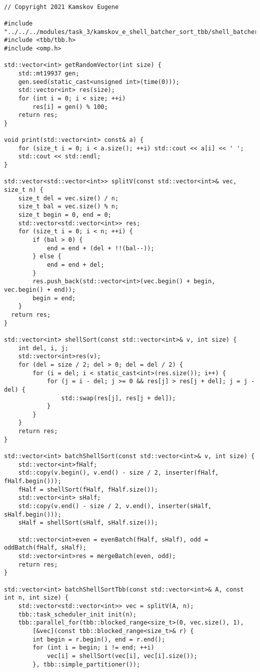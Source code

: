 \documentclass{report}
\begin{document}
\begin{lstlisting}

// Copyright 2021 Kamskov Eugene

#include "../../../modules/task_3/kamskov_e_shell_batcher_sort_tbb/shell_batcher.h"
#include <tbb/tbb.h>
#include <omp.h>

std::vector<int> getRandomVector(int size) {
    std::mt19937 gen;
    gen.seed(static_cast<unsigned int>(time(0)));
    std::vector<int> res(size);
    for (int i = 0; i < size; ++i)
        res[i] = gen() % 100;
    return res;
}

void print(std::vector<int> const& a) {
    for (size_t i = 0; i < a.size(); ++i) std::cout << a[i] << ' ';
    std::cout << std::endl;
}

std::vector<std::vector<int>> splitV(const std::vector<int>& vec, size_t n) {
    size_t del = vec.size() / n;
    size_t bal = vec.size() % n;
    size_t begin = 0, end = 0;
    std::vector<std::vector<int>> res;
    for (size_t i = 0; i < n; ++i) {
        if (bal > 0) {
            end = end + (del + !!(bal--));
        } else {
            end = end + del;
        }
        res.push_back(std::vector<int>(vec.begin() + begin, vec.begin() + end));
        begin = end;
    }
  return res;
}

std::vector<int> shellSort(const std::vector<int>& v, int size) {
    int del, i, j;
    std::vector<int>res(v);
    for (del = size / 2; del > 0; del = del / 2) {
        for (i = del; i < static_cast<int>(res.size()); i++) {
            for (j = i - del; j >= 0 && res[j] > res[j + del]; j = j - del) {
                std::swap(res[j], res[j + del]);
            }
        }
    }
    return res;
}

std::vector<int> batchShellSort(const std::vector<int>& v, int size) {
    std::vector<int>fHalf;
    std::copy(v.begin(), v.end() - size / 2, inserter(fHalf, fHalf.begin()));
    fHalf = shellSort(fHalf, fHalf.size());
    std::vector<int> sHalf;
    std::copy(v.end() - size / 2, v.end(), inserter(sHalf, sHalf.begin()));
    sHalf = shellSort(sHalf, sHalf.size());

    std::vector<int>even = evenBatch(fHalf, sHalf), odd = oddBatch(fHalf, sHalf);
    std::vector<int>res = mergeBatch(even, odd);
    return res;
}

std::vector<int> batchShellSortTbb(const std::vector<int>& A, const int n, int size) {
    std::vector<std::vector<int>> vec = splitV(A, n);
    tbb::task_scheduler_init init(n);
    tbb::parallel_for(tbb::blocked_range<size_t>(0, vec.size(), 1),
        [&vec](const tbb::blocked_range<size_t>& r) {
        int begin = r.begin(), end = r.end();
        for (int i = begin; i != end; ++i)
            vec[i] = shellSort(vec[i], vec[i].size());
        }, tbb::simple_partitioner());


\end{lstlisting}
\end{document}
